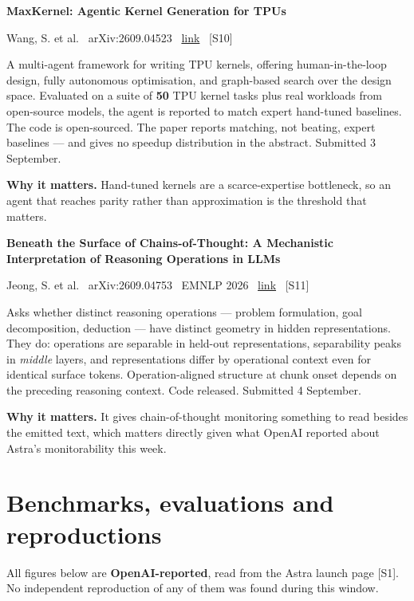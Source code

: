 \documentclass[11pt,a4paper]{article}
\newcommand{\entry}[4]{%
  \par\vspace{0.7em}%
  \Needspace*{5\baselineskip}%
  {\sffamily\bfseries\color{brandink}#1}\par
  {\footnotesize\color{brandgrey}#2 \textbullet\ \href{#3}{link} \textbullet\ \srcref{#4}}\par
  \vspace{0.15em}}
\newcommand{\why}[1]{\par{\small\textbf{Why it matters.} #1}\par}
\newcommand{\srcref}[1]{\textcolor{brandaccent}{[S#1]}}
\begin{document}
\entry{MaxKernel: Agentic Kernel Generation for TPUs}{Wang, S. et al. \textbullet\ arXiv:2609.04523}{https://arxiv.org/abs/2609.04523}{10}
A multi-agent framework for writing TPU kernels, offering human-in-the-loop design, fully
autonomous optimisation, and graph-based search over the design space. Evaluated on a
suite of \textbf{50} TPU kernel tasks plus real workloads from open-source models, the
agent is reported to match expert hand-tuned baselines. The code is open-sourced. The
paper reports matching, not beating, expert baselines --- and gives no speedup
distribution in the abstract. Submitted 3 September.
\why{Hand-tuned kernels are a scarce-expertise bottleneck, so an agent that reaches parity
rather than approximation is the threshold that matters.}

\entry{Beneath the Surface of Chains-of-Thought: A Mechanistic Interpretation of Reasoning Operations in LLMs}{Jeong, S. et al. \textbullet\ arXiv:2609.04753 \textbullet\ EMNLP 2026}{https://arxiv.org/abs/2609.04753}{11}
Asks whether distinct reasoning operations --- problem formulation, goal decomposition,
deduction --- have distinct geometry in hidden representations. They do: operations are
separable in held-out representations, separability peaks in \emph{middle} layers, and
representations differ by operational context even for identical surface tokens.
Operation-aligned structure at chunk onset depends on the preceding reasoning context.
Code released. Submitted 4 September.
\why{It gives chain-of-thought monitoring something to read besides the emitted text,
which matters directly given what OpenAI reported about Astra's monitorability this week.}

\section{Benchmarks, evaluations and reproductions}

All figures below are \textbf{OpenAI-reported}, read from the Astra launch page
\srcref{1}. No independent reproduction of any of them was found during this window.
\end{document}
